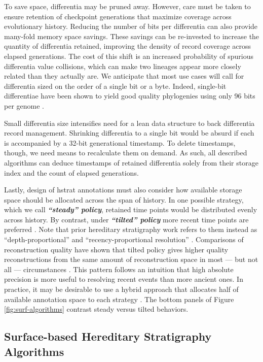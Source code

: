 To save space, differentia may be pruned away.
However, care must be taken to ensure retention of checkpoint generations that maximize coverage across evolutionary history.
Reducing the number of bits per differentia can also provide many-fold memory space savings.
These savings can be re-invested to increase the quantity of differentia retained, improving the density of record coverage across elapsed generations.
The cost of this shift is an increased probability of spurious differentia value collisions, which can make two lineages appear more closely related than they actually are.
We anticipate that most use cases will call for differentia sized on the order of a single bit or a byte.
Indeed, single-bit differentiae have been shown to yield good quality phylogenies using only 96 bits per genome \citep{moreno2024guide}.

Small differentia size intensifies need for a lean data structure to back differentia record management.
Shrinking differentia to a single bit would be absurd if each is accompanied by a 32-bit generational timestamp.
To delete timestamps, though, we need means to recalculate them on demand.
As such, all described algorithms can deduce timestamps of retained differentia solely from their storage index and the count of elapsed generations.

Lastly, design of hstrat annotations must also consider how available storage space should be allocated across the span of history.
In one possible strategy, which we call \textit{\textbf{``steady'' policy}}, retained time points would be distributed evenly across history.
By contrast, under \textit{\textbf{``tilted'' policy}} more recent time points are preferred \citep{han2005stream,zhao2005generalized}.
Note that prior hereditary stratigraphy work refers to them instead as ``depth-proportional'' and ``recency-proportional resolution'' \citep{moreno2022hereditary}.
Comparisons of reconstruction quality have shown that tilted policy gives higher quality reconstructions from the same amount of reconstruction space in most --- but not all --- circumstances \citep{moreno2024guide}.
This pattern follows an intuition that high absolute precision is more useful to resolving recent events than more ancient ones.
In practice, it may be desirable to use a hybrid approach that allocates half of available annotation space to each strategy \citep{moreno2024guide}.
The bottom panels of Figure \ref{fig:surf-algorithms} contrast steady versus tilted behaviors.

\subsection{Surface-based Hereditary Stratigraphy Algorithms}

